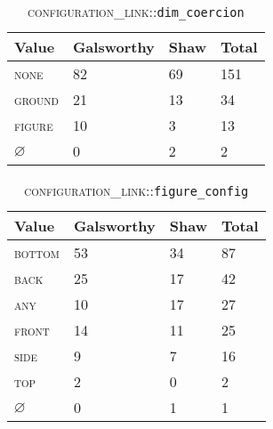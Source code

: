 \documentclass[11pt]{article}
\begin{document}
\begin{appendix}
    \begin{table}[here]
    \begin{center}
    \begin{tabular}
        {|l|l|l|l|}
        \hline  \textbf{Value} & \textbf{Galsworthy} & \textbf{Shaw} & \textbf{Total} \\
        \hline  \textsc{none} & 82 & 69 & 151  \\
        \hline  \textsc{ground} & 21 & 13 & 34 \\
        \hline  \textsc{figure} & 10 & 3 & 13  \\
        \hline  $\varnothing$ & 0 & 2 & 2      \\
        \hline
    \end{tabular}
    \caption{\textsc{configuration\_link}::\texttt{dim\_coercion}}
    \label{tab:dim_coercion-counts}
    \end{center}
    \end{table}

    \begin{table}[here]
    \begin{center}
    \begin{tabular}
        {|l|l|l|l|}
        \hline  \textbf{Value} & \textbf{Galsworthy} & \textbf{Shaw} & \textbf{Total} \\
        \hline  \textsc{bottom} & 53 & 34 & 87 \\
        \hline  \textsc{back} & 25 & 17 & 42   \\
        \hline  \textsc{any} & 10 & 17 & 27    \\
        \hline  \textsc{front} & 14 & 11 & 25  \\
        \hline  \textsc{side} & 9 & 7 & 16     \\
        \hline  \textsc{top} & 2 & 0 & 2       \\
        \hline  $\varnothing$ & 0 & 1 & 1      \\
        \hline
    \end{tabular}
    \caption{\textsc{configuration\_link}::\texttt{figure\_config}}
    \label{tab:figure_config-counts}
    \end{center}
    \end{table}


\end{appendix}
\end{document}

